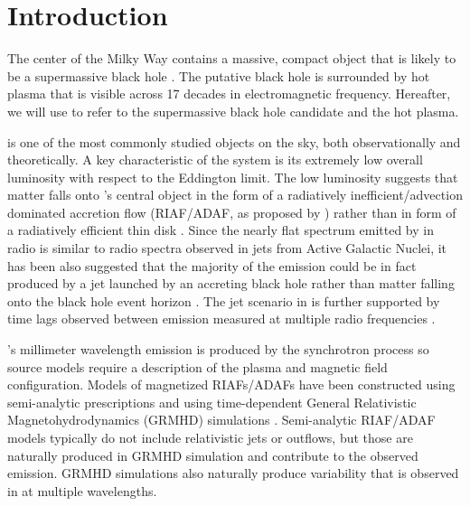 \section{Introduction}
\label{sec:intro}

The center of the Milky Way contains a massive, compact object that is likely to be a supermassive black hole \citep{2019Sci...365..664D, 2019A&A...625L..10G}.
The putative black hole is surrounded by hot plasma that is visible across 17 decades in electromagnetic frequency.
Hereafter, we will use \sgra to refer to the supermassive black hole candidate and the hot plasma.

\sgra is one of the most commonly studied objects on the sky, both observationally and theoretically.  A key  characteristic of the \sgra system is its extremely low overall luminosity with respect to the Eddington limit.
The low luminosity suggests that matter falls onto \sgra's central object in the form of a radiatively inefficient/advection dominated accretion flow (RIAF/ADAF, as proposed by \citealt{1977ApJ...214..840I,1994ApJ...428L..13N, 1995ApJ...444..231N, 1995ApJ...452..710N, 1996A&AS..120C.287N, 1998ApJ...492..554N,2014ARA&A..52..529Y}) rather than in form of a radiatively efficient thin disk \citep{1973A&A....24..337S}.
Since the nearly flat spectrum emitted by \sgra in radio is similar to radio spectra observed in jets from Active Galactic Nuclei, it has been also suggested that the majority of the \sgra emission could be in fact produced by a jet launched by an accreting black hole rather than matter falling onto the black hole event horizon \citep{1993A&A...278L...1F, 2000A&A...362..113F}.
The jet scenario in \sgra is further supported by time lags observed between emission measured at multiple radio frequencies \citep{2021arXiv210713402B}.

\sgra's millimeter wavelength emission is produced by the  synchrotron process so source models require a description of the plasma and magnetic field configuration.  Models of magnetized RIAFs/ADAFs have been constructed using semi-analytic prescriptions \citep[e.g.,][]{1995Natur.374..623N,2000ApJ...541..234O, 2009ApJ...697...45B,2011ApJ...735..110B} and using time-dependent General Relativistic Magnetohydrodynamics (GRMHD) simulations \citep[e.g.,][]{2000ApJ...528..462H, 2003ApJ...589..458D, 2003ApJ...589..444G, 2007CQGra..24S.235G, 2012ApJS..201....9F, 2014ApJ...796...22F, 2016ApJS..225...22W, 2017ApJS..231...17A, 2018JPhCS1031a2008O, Olivares2019, 2019ApJS..243...26P}.
Semi-analytic RIAF/ADAF models typically do not include relativistic jets or outflows, but those are naturally produced in GRMHD simulation and contribute to the observed emission. GRMHD simulations also naturally produce variability that is observed in \sgra at multiple wavelengths.

